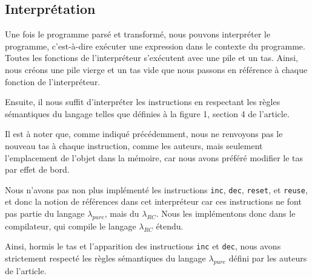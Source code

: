 \documentclass{rapportECL}
\begin{document}



\subsection{Interprétation}

Une fois le programme parsé et transformé, nous pouvons interpréter le programme, c'est-à-dire exécuter une expression dans le 
contexte du programme. Toutes les fonctions de l'interpréteur s'exécutent avec une pile et un tas. Ainsi, nous créons une pile vierge
et un tas vide que nous passons en référence à chaque fonction de l'interpréteur.

Ensuite, il nous suffit d'interpréter les instructions en respectant les règles sémantiques du langage telles que définies à la figure 1, section 4 de l'article\cite{ullrich_counting_2020}.



\medskip


Il est à noter que, comme indiqué précédemment, nous ne renvoyons pas le nouveau tas à chaque instruction, comme les auteurs, 
mais seulement l'emplacement de l'objet dans la mémoire, car nous avons préféré modifier le tas par effet de bord.

Nous n'avons pas non plus implémenté les instructions \verb|inc|, \verb|dec|, \verb|reset|, et \verb|reuse|, et donc la notion de références dans cet interpréteur car ces instructions ne font pas partie du langage $\lambda_{pure}$, mais du $\lambda_{RC}$.
Nous les implémentons donc dans le compilateur, qui compile le langage $\lambda_{RC}$ étendu.

Ainsi, hormis le tas et l'apparition des instructions \verb|inc| et \verb|dec|, nous avons strictement respecté les règles sémantiques du langage $\lambda_{pure}$ défini par les auteurs de l'article.
\end{document}
